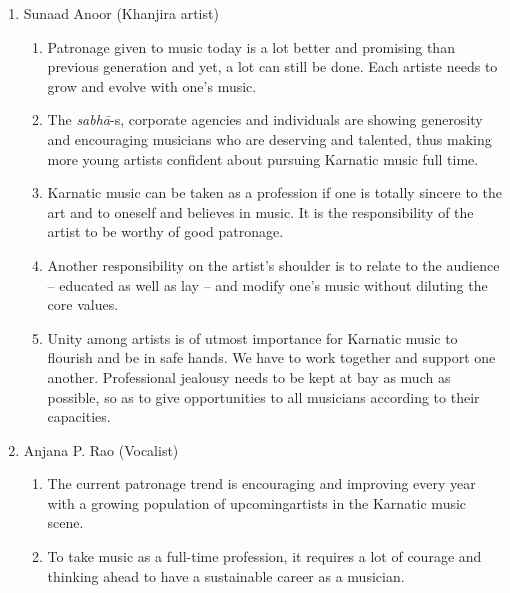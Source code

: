 \begin{enumerate}
\itemsep=0pt

 \item Sunaad Anoor (Khanjira artist)
 
\begin{enumerate}
\itemsep=0pt

 \item Patronage given to music today is a lot better and promising than previous generation and yet, a lot can still be done. Each artiste needs to grow and evolve with one’s music.

 \item The \textit{sabhā}-s, corporate agencies and individuals are showing generosity and encouraging musicians who are deserving and talented, thus making more young artists confident about pursuing Karnatic music full time.

 \item Karnatic music can be taken as a profession if one is totally sincere to the art and to oneself and believes in music. It is the responsibility of the artist to be worthy of good patronage.

 \item Another responsibility on the artist’s shoulder is to relate to the audience – educated as well as lay – and modify one’s music without diluting the core values.

 \item Unity among artists is of utmost importance for Karnatic music to flourish and be in safe hands. We have to work together and support one another. Professional jealousy needs to be kept at bay as much as possible, so as to give opportunities to all musicians according to their capacities.
\end{enumerate}


 \item Anjana P. Rao (Vocalist)
 
\begin{enumerate}
\itemsep=0pt

 \item The current patronage trend is encouraging and improving every year with a growing population of upcoming\break artists in the Karnatic music scene.

 \item To take music as a full-time profession, it requires a lot of courage and thinking ahead to have a sustainable career as a musician.


\end{enumerate}
\end{enumerate}
